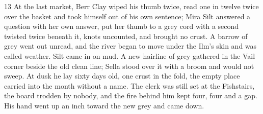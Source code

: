 \begin{CRchronicle}{13}
At the last market, Berr Clay wiped his thumb twice, read one in twelve twice over the basket and took himself out of his own sentence; Mira Silt answered a question with her own answer, put her thumb to a grey cord with a second twisted twice beneath it, knots uncounted, and brought no crust. A barrow of grey went out unread, and the river began to move under the Ilm’s skin and was called weather. Silt came in on mud. A new hairline of grey gathered in the Vail corner beside the old clean line; Sella stood over it with a broom and would not sweep. At dusk he lay sixty days old, one crust in the fold, the empty place carried into the month without a name. The clerk was still set at the Fishstairs, the board trodden by nobody, and the fire behind him kept four, four and a gap. His hand went up an inch toward the new grey and came down.
\end{CRchronicle}
